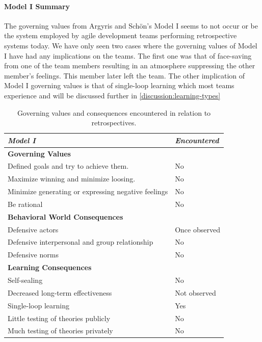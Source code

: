 \paragraph{Model I Summary}
The governing values from Argyris and Schön's Model I seems to not occur or be the system employed by agile development teams performing retrospective systems today. We have only seen two cases where the governing values of Model I have had any implications on the teams. The first one was that of face-saving from one of the team members resulting in an atmosphere suppressing the other member's feelings. This member later left the team. The other implication of Model I governing values is that of single-loop learning which most teams experience and will be discussed further in \autoref{discussion:learning-types}

\begin{table}[h]
	\begin{center}
		\caption{Governing values and consequences encountered in relation to retrospectives.}
		\label{table:model-i-occurences}
		\begin{tabular}{l l}
			\hline
			\textit{Model I} & \textit{Encountered} \\
			\hline
			\textbf{Governing Values} & \\
			Defined goals and try to achieve them. & No \\
			Maximize winning and minimize loosing. & No \\
			Minimize generating or expressing negative feelings & No \\
			Be rational & No \\
			\hline
			\textbf{Behavioral World Consequences} & \\
			Defensive actors & Once observed \\
			Defensive interpersonal and group relationship & No \\
			Defensive norms & No \\
			\hline
			\textbf{Learning Consequences} & \\
			Self-sealing & No \\
			Decreased long-term effectiveness & Not observed \\
			Single-loop learning & Yes \\
			Little testing of theories publicly & No \\
			Much testing of theories privately & No \\
			\hline
		\end{tabular}
	\end{center}
\end{table}

